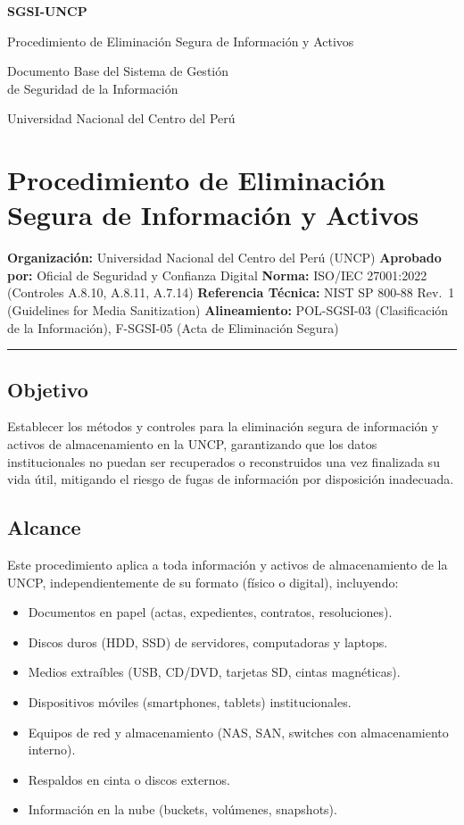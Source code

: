 \documentclass[10pt,letterpaper]{article}
\newcommand{\makecover}{
\begin{titlepage}
\centering
\vspace*{2cm}
{\Huge\bfseries\color{uncpblue} SGSI-UNCP\par}
\vspace{0.7cm}
{\LARGE Procedimiento de Eliminación Segura de Información y
Activos\par}
\vspace{0.5cm}
{\large Documento Base del Sistema de Gestión\\de Seguridad de la Información\par}
\vspace{1.5cm}
{\small Universidad Nacional del Centro del Perú\par}
\vfill
\end{titlepage}
}
\begin{document}
\makecover
\setcounter{tocdepth}{2}
\RaggedRight
\tableofcontents
\newpage

\RaggedRight
\section{Procedimiento de Eliminación Segura de Información y
Activos}\label{procedimiento-de-eliminaciuxf3n-segura-de-informaciuxf3n-y-activos}

\textbf{Organización:} Universidad Nacional del Centro del Perú (UNCP)
\textbf{Aprobado por:} Oficial de Seguridad y Confianza Digital
\textbf{Norma:} ISO/IEC 27001:2022 (Controles A.8.10, A.8.11, A.7.14)
\textbf{Referencia Técnica:} NIST SP 800-88 Rev.~1 (Guidelines for Media
Sanitization) \textbf{Alineamiento:} POL-SGSI-03 (Clasificación de la
Información), F-SGSI-05 (Acta de Eliminación Segura)

\begin{center}\rule{0.5\linewidth}{0.5pt}\end{center}

\subsection{Objetivo}\label{objetivo}

Establecer los métodos y controles para la eliminación segura de
información y activos de almacenamiento en la UNCP, garantizando que los
datos institucionales no puedan ser recuperados o reconstruidos una vez
finalizada su vida útil, mitigando el riesgo de fugas de información por
disposición inadecuada.

\subsection{Alcance}\label{alcance}

Este procedimiento aplica a toda información y activos de almacenamiento
de la UNCP, independientemente de su formato (físico o digital),
incluyendo:

\begin{itemize}
\tightlist
\item
  Documentos en papel (actas, expedientes, contratos, resoluciones).
\item
  Discos duros (HDD, SSD) de servidores, computadoras y laptops.
\item
  Medios extraíbles (USB, CD/DVD, tarjetas SD, cintas magnéticas).
\item
  Dispositivos móviles (smartphones, tablets) institucionales.
\item
  Equipos de red y almacenamiento (NAS, SAN, switches con almacenamiento
  interno).
\item
  Respaldos en cinta o discos externos.
\item
  Información en la nube (buckets, volúmenes, snapshots).
\end{itemize}
\end{document}
